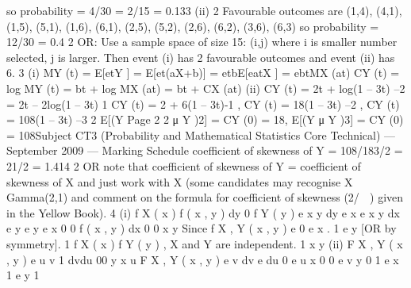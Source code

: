 \documentclass[a4paper,12pt]{article}
\begin{document}
so probability = 4/30 = 2/15 = 0.133
(ii)
2
Favourable outcomes are
(1,4), (4,1), (1,5), (5,1), (1,6), (6,1), (2,5), (5,2), (2,6), (6,2), (3,6), (6,3)
so probability = 12/30 = 0.4
2
OR: Use a sample space of size 15: {(i,j)} where i is smaller number selected,
j is larger.
Then event (i) has 2 favourable outcomes and event (ii) has 6.
3
(i)
MY (t) = E[etY ] = E[et(aX+b)] = etbE[eatX ] = ebtMX (at)
CY (t) = log MY (t) = bt + log MX (at) = bt + CX (at)
(ii)
CY (t) = 2t + log(1 – 3t) –2 = 2t – 2log(1 – 3t) 1
CY (t) = 2 + 6(1 – 3t)-1 , CY (t) = 18(1 – 3t) –2 , CY (t) = 108(1 – 3t) –3 2
E[(Y
Page 2
2
μ Y )2] = CY (0) = 18, E[(Y
μ Y )3] = CY (0) = 108Subject CT3 (Probability and Mathematical Statistics Core Technical) — September 2009 — Marking Schedule
coefficient of skewness of Y = 108/183/2 = 21/2 = 1.414
2
OR note that coefficient of skewness of Y = coefficient of skewness of X and
just work with X (some candidates may recognise X ~ Gamma(2,1) and
comment on the formula for coefficient of skewness (2/  ) given in the
Yellow Book).
4
(i)
f X ( x )
f ( x , y ) dy
0
f Y ( y )
e x y
dy e x
e x y
dx e y
e y
e x
0
0
f ( x , y ) dx
0
0
x y
Since f X , Y ( x , y ) e
0
e x . 1
e y [OR by symmetry]. 1
f X ( x ) f Y ( y ) , X and Y are independent.
1
x y
(ii)
F X , Y ( x , y )
e
u v
1
dvdu
00
y
x
u
F X , Y ( x , y )
e v dv
e du
0
e
u x
0
0
e
v y
0
1 e
x
1 e
y
1
\end{document}
